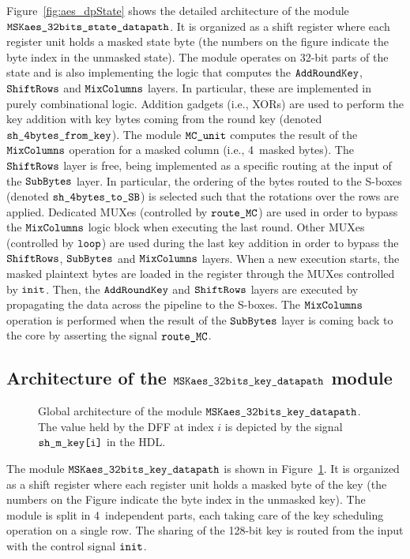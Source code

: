 \documentclass{scrartcl}
\begin{document}
Figure~\ref{fig:aes_dpState} shows the detailed architecture of the
module $\texttt{MSKaes\_32bits\_state\_datapath}$. It is organized as a shift register where each
register unit holds a masked state byte (the numbers on the figure
indicate the byte index in the unmasked state).
The module operates on 32-bit parts of the state and is also implementing the
logic that computes the $\texttt{AddRoundKey}$, $\texttt{ShiftRows}$ and $\texttt{MixColumns}$ layers.
In particular, these are implemented in purely
combinational logic.
Addition gadgets (i.e., XORs) are used to perform the key addition with key
bytes coming from the round
key (denoted $\texttt{sh\_4bytes\_from\_key}$).
The module $\texttt{MC\_unit}$ computes the
result of the $\texttt{MixColumns}$ operation for a masked column (i.e., 4~masked bytes). The
$\texttt{ShiftRows}$ layer is free, being implemented as a specific
routing at the input of the $\texttt{SubBytes}$ layer.
In particular, the ordering of the bytes routed to the
S-boxes (denoted $\texttt{sh\_4bytes\_to\_SB}$) is selected such that the rotations over
the rows are applied. Dedicated MUXes (controlled by $\texttt{route\_MC}$) are
used in order to bypass the $\texttt{MixColumns}$ logic block when executing the last round.
Other MUXes (controlled by $\texttt{loop}$) are used during the
last key addition in order to bypass the $\texttt{ShiftRows}$, $\texttt{SubBytes}$ and $\texttt{MixColumns}$ layers.
When a new execution starts, the masked plaintext bytes are loaded in the register through the 
MUXes controlled by $\texttt{init}$.
Then, the $\texttt{AddRoundKey}$ and $\texttt{ShiftRows}$ layers are executed by propagating the data 
across the pipeline to the S-boxes.
The $\texttt{MixColumns}$ operation is performed when the result of the $\texttt{SubBytes}$ layer is coming back to the 
core by asserting the signal $\texttt{route\_MC}$. 

\subsection{Architecture of the $\texttt{MSKaes\_32bits\_key\_datapath}$ module}

\begin{figure}
    \centering
    \resizebox{\textwidth}{!}{
        \begin{tikzpicture}
            
        \end{tikzpicture}
    }
    \caption{Global architecture of the module $\texttt{MSKaes\_32bits\_key\_datapath}$. The value held by the DFF at index $i$ is depicted by the signal $\texttt{sh\_m\_key[i]}$ in the HDL.}
    \label{fig:aes_dpKey}
\end{figure}

The module $\texttt{MSKaes\_32bits\_key\_datapath}$ is shown in Figure~\ref{fig:aes_dpKey}. It is
organized as a shift register where each register unit holds a masked byte of
the key (the numbers on the Figure indicate the byte index in the unmasked
key).  The module is split in 4~independent parts, each taking care of the key
scheduling operation on a single row. The sharing of the 128-bit key is routed from the input with the 
control signal $\texttt{init}$.
\end{document}
